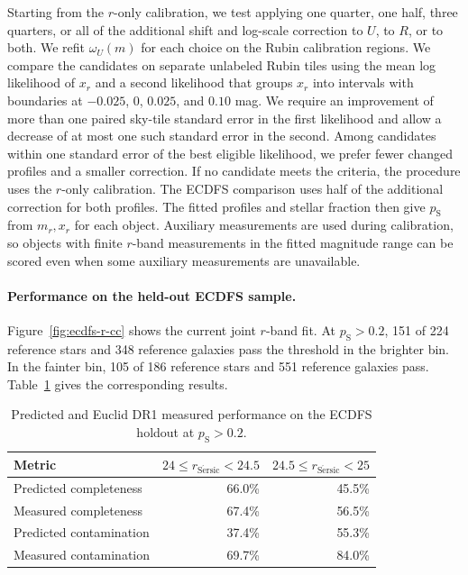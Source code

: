 Starting from the \(r\)-only calibration, we test applying one quarter,
one half, three quarters, or all of the additional shift and log-scale
correction to \(U\), to \(R\), or to both. We refit \(\omega_U(m)\)
for each choice on the Rubin calibration regions. We compare the
candidates on separate unlabeled Rubin tiles using the mean log
likelihood of \(x_r\) and a second likelihood that groups \(x_r\) into
intervals with boundaries at \(-0.025\), \(0\), \(0.025\), and \(0.10\) mag.
We require an improvement of more than one paired sky-tile standard
error in the first likelihood and allow a decrease of at most one
such standard error in the second. Among candidates within one
standard error of the best eligible likelihood, we prefer fewer
changed profiles and a smaller correction. If no candidate meets
the criteria, the procedure uses the \(r\)-only calibration. The ECDFS
comparison uses half of the additional correction for both profiles.
The fitted profiles and stellar fraction then give \(p_{\mathrm S}\)
from \(m_r,x_r\) for each object. Auxiliary measurements are used
during calibration, so objects with finite \(r\)-band measurements
in the fitted magnitude range can be scored even when some auxiliary
measurements are unavailable.

\paragraph{Performance on the held-out ECDFS sample.}
Figure~\ref{fig:ecdfs-r-cc} shows the current joint \(r\)-band fit.
At \(p_{\mathrm S}>0.2\), 151 of 224 reference stars and 348 reference
galaxies pass the threshold in the brighter bin. In the fainter bin,
105 of 186 reference stars and 551 reference galaxies pass.
Table~\ref{tab:v12-ecdfs-transfer} gives the corresponding results.

\begin{table}[htbp]
\centering
\caption{Predicted and Euclid DR1 measured performance on the ECDFS
holdout at \(p_{\mathrm S}>0.2\).}
\label{tab:v12-ecdfs-transfer}
\begin{tabular}{lrr}
\hline
Metric & \(24\leq r_{\mathrm{S\acute{e}rsic}}<24.5\)
       & \(24.5\leq r_{\mathrm{S\acute{e}rsic}}<25\)\\
\hline
Predicted completeness & 66.0\% & 45.5\%\\
Measured completeness & 67.4\% & 56.5\%\\
Predicted contamination & 37.4\% & 55.3\%\\
Measured contamination & 69.7\% & 84.0\%\\
\hline
\end{tabular}
\end{table}

